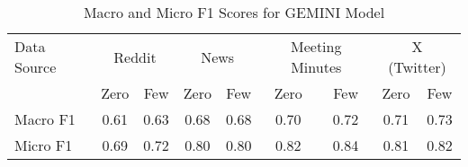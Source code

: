 \begin{table}[htbp]
\centering
\begin{tabular}{l *{8}{c}}
\toprule
Data Source & \multicolumn{2}{c}{Reddit} & \multicolumn{2}{c}{News} & \multicolumn{2}{c}{Meeting Minutes} & \multicolumn{2}{c}{X (Twitter)} \\
& Zero & Few & Zero & Few & Zero & Few & Zero & Few \\
\midrule
Macro F1 & 0.61 & 0.63 & 0.68 & 0.68 & 0.70 & 0.72 & 0.71 & 0.73 \\
Micro F1 & 0.69 & 0.72 & 0.80 & 0.80 & 0.82 & 0.84 & 0.81 & 0.82 \\
\bottomrule
\end{tabular}
\caption{Macro and Micro F1 Scores for GEMINI Model}
\label{tab:gemini_macro_micro}
\end{table}
